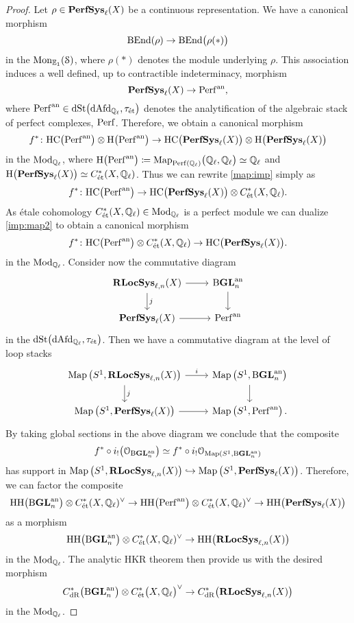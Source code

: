 \documentclass[10pt,a4paper]{amsart}
\numberwithin{equation}{subsection}
\theoremstyle{plain}
\theoremstyle{definition}
\theoremstyle{remark}
\numberwithin{equation}{section}
\begin{document}
\begin{proof}
Let $\rho \in \mathbf{PerfSys}_{\ell}(X)$ be a continuous representation. We have a canonical morphism
	\[
		\mathrm{B} \mathrm{End}(\rho) \to \mathrm{B} \mathrm{End} \big( \rho(*) \big)
	\]
in the \infcat $\mathrm{Mon}_{\mathbb E_1} ( \mathcal S)$, where $\rho(*)$ denotes the module underlying $\rho$. This association induces a well defined, up to contractible indeterminacy, morphism
	\[
		\mathbf{PerfSys}_{\ell}(X) \to \mathrm{Perf}^{\mathrm{an}},
	\]
where $\mathrm{Perf}^{\mathrm{an}} \in \mathrm{dSt} \big( \mathrm{dAfd}_{\mathbb{Q}_\ell}, \tau_{\text{\'et}} \big)$ denotes the analytification of the algebraic stack of perfect complexes, $\mathrm{Perf}$. Therefore, we obtain a canonical morphism
	\begin{equation} \label{map:imp}
	 	f^* \colon \mathrm H \mathrm C \big( \mathrm{Perf}^{\mathrm{an}} \big) \otimes \mathrm H \big( \mathrm{Perf}^{\mathrm{an}} \big) \to \mathrm H \mathrm C \big( \mathbf{PerfSys}_{\ell}(X) \big) \otimes \mathrm H \big( \mathbf{PerfSys}_{\ell}(X) \big)
	\end{equation}
in the \infcat $\mathrm{Mod}_{\mathbb Q_\ell}$, where $\mathrm H \big( \mathrm{Perf}^{\mathrm{an}} \big) \coloneqq \mathrm{Map}_{\mathrm{Perf}(\mathbb Q_\ell)} \big( \mathbb Q_\ell , \mathbb Q_\ell \big) \simeq \mathbb Q_\ell$ and $  \mathrm H \big( \mathbf{PerfSys}_{\ell}(X) \big) \simeq C^*_{\text{\'et}}(X, \mathbb Q_\ell)$. Thus we can rewrite \eqref{map:imp} simply as
	\begin{equation} \label{imp:map2}
		f^* \colon	\mathrm H \mathrm C \big( \mathrm{Perf}^{\mathrm{an}} \big) \to \mathrm H \mathrm C \big( \mathbf{PerfSys}_{\ell}(X) \big) \otimes C^*_{\text{\'et}}(X, \mathbb Q_\ell).
	\end{equation}
As \'etale cohomology $C^*_{\text{\'et}}(X, \mathbb Q_\ell) \in \mathrm{Mod}_{\mathbb Q_\ell}$ is a perfect module we can dualize \eqref{imp:map2} to obtain a canonical morphism
	\[
		f^*  \colon \mathrm H \mathrm C \big( \mathrm{Perf}^{\mathrm{an}} \big) \otimes C^*_{\text{\'et}}(X, \mathbb Q_\ell ) \to  \mathrm H \mathrm C \big( \mathbf{PerfSys}_{\ell}(X) \big).
	\]
in the \infcat $\mathrm{Mod}_{\mathbb Q_\ell}$. Consider now the commutative diagram
	\[
	\begin{tikzcd}
		\dLocSys(X) \ar{r} \ar{d}{j} & \rmB \anGLn \ar{d} \\
		\PerfSys(X) \ar{r} & \Perf^\an
	\end{tikzcd}
	\]
in the \infcat $\mathrm{dSt} \big( \mathrm{dAfd}_{\mathbb{Q}_\ell}, \tau_{\text{\'et}} \big)$. Then we have a commutative diagram at the level of loop stacks
	\[
	\begin{tikzcd}
		\Map \left( S^1, 	\dLocSys(X) \right) \ar{r}{i} \ar{d}{j} & \Map \left( S^1, \rmB \anGLn \right) \ar{d} \\
		\Map \left( S^1, \PerfSys(X) \right) \ar{r} & \Map \left( S^1, \Perf^\an \right).
	\end{tikzcd}
	\]
By taking global sections in the above diagram we conclude that the composite 
	\[
		f^* \circ i_!   \cH \cH \big( \cO_{ \rmB \anGLn} \big) \simeq f^* \circ i_! \cO_{\Map \left( S^1, 	\rmB \anGLn \right)}
	\]
has support in $\mathrm{Map} \left( S^1, 	\mathbf R \mathbf{LocSys}_{\ell, n}(X) \right) \hookrightarrow \mathrm{Map} \left( S^1, 	\mathbf{PerfSys}_{\ell}(X) \right)$. Therefore, we can factor the composite
	\[
		\mathrm H \mathrm H \big( \mathrm{B} \mathbf{GL}_n^{\mathrm{an}} \big)  \otimes C^*_{\text{\'et}}(X, \mathbb Q_\ell)^\vee \to \mathrm H \mathrm H \big( \mathrm{Perf}^{\mathrm{an}} \big)  \otimes C^*_{\text{\'et}}(X, \mathbb Q_\ell)^\vee \to \mathrm H \mathrm H \big( \mathbf{PerfSys}_{\ell}(X) \big)
	\]
as a morphism 
	\[
		\mathrm H \mathrm H \big( \mathrm{B} \mathbf{GL}_n^{\mathrm{an}} \big)  \otimes C^*_{\text{\'et}}(X, \mathbb Q_\ell)^\vee \to  \mathrm H \mathrm H \big( \mathbf R \mathbf{LocSys}_{\ell, n}(X) \big)
	\]
in the \infcat $\mathrm{Mod}_{\mathbb Q_\ell}$. The analytic HKR theorem then provide us with the desired morphism
	\[
		C^*_{\mathrm{dR}} \big( \mathrm{B} \mathbf{GL}_n^{\mathrm{an}} \big) \otimes C^*_{\text{\'et}} \big(X, \mathbb Q_\ell \big)^\vee \to  C^*_{\mathrm{dR}} \big( \mathbf R \mathbf{LocSys}_{\ell, n}(X) \big)
	\]
in the \infcat $\mathrm{Mod}_{\mathbb Q_\ell}$.
\end{proof}
\end{document}
